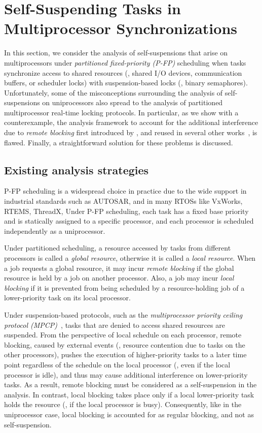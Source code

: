 \section{Self-Suspending Tasks in Multiprocessor Synchronizations}
\label{sec:syn}

In this section, we consider the analysis of self-suspensions that arise on multiprocessors under \emph{partitioned fixed-priority (P-FP)} scheduling when tasks synchronize access to shared resources (\eg, shared I/O devices, communication buffers, or scheduler locks) with suspension-based locks (\eg, binary semaphores). Unfortunately, some of the misconceptions surrounding the analysis of self-suspensions on uniprocessors also spread to the analysis of partitioned multiprocessor real-time locking protocols. In particular, as we show with a counterexample, the analysis framework to account for the additional interference due to \emph{remote blocking} first introduced by \cite{lakshmanan-2009}, and reused in several other works~\cite{zeng-2011,bbb-2013,yang-2013,kim-2014,han-2014,carminati-2014,yang-2014},  is flawed. Finally, a straightforward solution for these problems is discussed. 

\subsection{Existing analysis strategies}
\label{sec:papers}

P-FP scheduling is a widespread choice in practice due to the wide support in industrial standards such as AUTOSAR, and in many RTOSs like VxWorks, RTEMS, ThreadX, \etc Under P-FP scheduling, each task has a fixed base priority and is statically assigned to a specific processor, and each processor is scheduled independently as a uniprocessor. 

Under partitioned scheduling, a resource accessed by tasks from different processors is called a \emph{global resource}, otherwise it is called a \emph{local resource}. When a job requests a global resource, it may incur \emph{remote blocking} if the global resource is held by a job on another processor. Also, a job may incur \emph{local blocking} if it is prevented from being scheduled by a resource-holding job of a lower-priority task on its local processor. 

Under suspension-based protocols, such as the \emph{multiprocessor priority ceiling protocol (MPCP)}~\cite{rajkumar-1990}, tasks that are denied to access shared resources are suspended. From the perspective of local schedule on each processor, remote blocking, caused by external events (\ie, resource contention due to tasks on the other processors), pushes the execution of higher-priority tasks to a later time point regardless of the schedule on the local processor (\ie, even if the local processor is idle), and thus may cause additional interference on lower-priority tasks. As a result, remote blocking must be considered as a self-suspension in the analysis. In contrast, local blocking takes place only if a local lower-priority task holds the resource (\ie, if the local processor is busy). Consequently, like in the uniprocessor case, local blocking is accounted for as regular blocking, and not as self-suspension.


